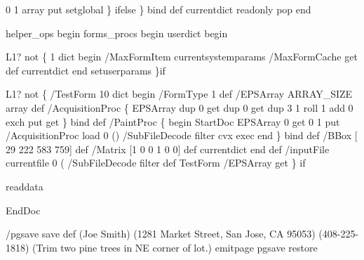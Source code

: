 \documentclass[11pt]{article}
\begin{document}
          0 1 array put %
      setglobal  %
  \} ifelse
\} bind def
currentdict readonly pop end

helper_ops begin
forms_procs begin
userdict begin

L1? not \{
   1 dict begin
        /MaxFormItem currentsystemparams /MaxFormCache get def
   currentdict end
   setuserparams
\}if

L1? not \{ %
  /TestForm
  10 dict begin
     /FormType 1 def
     /EPSArray ARRAY_SIZE array def
     /AcquisitionProc \{
        EPSArray dup 0 get dup 0 get %
        dup 3 1 roll                 %
        1 add 0 exch put             %
        get                          %
     \} bind def
     /PaintProc \{
       begin
         StartDoc
           EPSArray 0 get 0 1 put
           /AcquisitionProc load 0 () /SubFileDecode filter
           cvx exec
       end %
     \} bind def
     /BBox [ 29 222 583 759] def %
     /Matrix [1 0 0 1 0 0] def
  currentdict end def %
  /inputFile currentfile 0 (%
  /SubFileDecode filter def
  TestForm /EPSArray get 
\} if

readdata

EndDoc %

/pgsave save def
(Joe Smith)                                  %
(1281 Market Street, San Jose, CA 95053)     %
(408-225-1818)                               %
(Trim two pine trees in NE corner of lot.)   %
emitpage                                     %
pgsave restore
\end{document}
